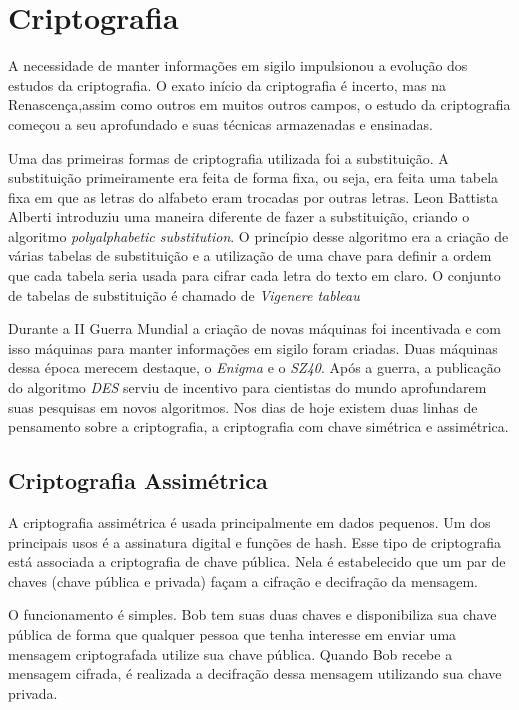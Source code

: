 \chapter{Criptografia}
\label{cryptograhy}

%
A necessidade de manter informações em sigilo impulsionou a evolução dos estudos da criptografia. O exato início da criptografia é incerto, mas na Renascença,assim como outros em muitos outros campos, o estudo da criptografia começou a seu aprofundado e suas técnicas armazenadas e ensinadas. ~\cite{donald-davies}

%
Uma das primeiras formas de criptografia utilizada foi a substituição. A substituição primeiramente era feita de forma fixa, ou seja, era feita uma tabela fixa em que as letras do alfabeto eram trocadas por outras letras. Leon Battista Alberti introduziu uma maneira diferente de fazer a substituição, criando o algoritmo \textit{polyalphabetic substitution}. O princípio desse algoritmo era a criação de várias tabelas de substituição e a utilização de uma chave para definir a ordem que cada tabela seria usada para cifrar cada letra do texto em claro. O conjunto de tabelas de substituição é chamado de \textit{Vigenere tableau}

%
Durante a II Guerra Mundial a criação de novas máquinas foi incentivada e com isso máquinas para manter informações em sigilo foram criadas. Duas máquinas dessa época merecem destaque, o \textit{Enigma} e o 	\textit{SZ40}. Após a guerra, a publicação do algoritmo \textit{DES} serviu de incentivo para cientistas do mundo aprofundarem suas pesquisas em novos algoritmos. Nos dias de hoje existem duas linhas de pensamento sobre a criptografia, a criptografia com chave simétrica e assimétrica. 


\section{Criptografia Assimétrica}
\label{assymmetric-cryptography}

%
A criptografia assimétrica é usada principalmente em dados pequenos. Um dos principais usos é a assinatura digital e funções de hash. Esse tipo de criptografia está associada a criptografia de chave pública. Nela é estabelecido que um par de chaves (chave pública e privada) façam a cifração e decifração da mensagem. 

%
O funcionamento é simples. Bob tem suas duas chaves e disponibiliza sua chave pública de forma que qualquer pessoa que tenha interesse em enviar uma mensagem criptografada utilize sua chave pública. Quando Bob recebe a mensagem cifrada, é realizada a decifração dessa mensagem utilizando sua chave privada.

